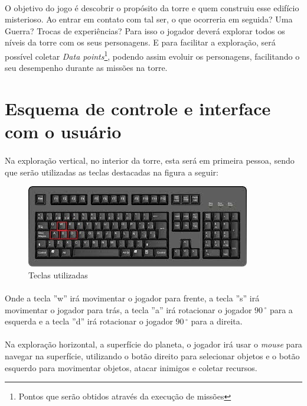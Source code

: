 \documentclass[11pt]{article} %
\begin{document}
\paragraph{}O objetivo do jogo é descobrir o propósito da torre e quem construiu esse edifício misterioso. Ao entrar em contato com tal ser, o que ocorreria em seguida? Uma Guerra? Trocas de experiências? Para isso o jogador deverá explorar todos os níveis da torre com os seus personagens. E para facilitar a exploração, será possível coletar \textit{Data points}\footnote{Pontos que serão obtidos através da execução de missões}, podendo assim evoluir os personagens, facilitando o seu desempenho durante as missões na torre. 

\section{Esquema de controle e interface com o usuário}

\paragraph{}Na exploração vertical, no interior da torre, esta será em primeira pessoa, sendo que serão utilizadas as teclas destacadas na figura a seguir:\\

\begin{figure}[!htp]
\centering
\includegraphics[scale=0.75]{pictures/teclado.jpg}
\caption{Teclas utilizadas}
\label{Teclado}
\end{figure}

\paragraph{}Onde a tecla ''w'' irá movimentar o jogador para frente, a tecla ''s'' irá movimentar o jogador para trás, a tecla ''a'' irá rotacionar o jogador $90\,^{\circ}$ para a esquerda e a tecla ''d'' irá rotacionar o jogador $90\,^{\circ}$ para a direita.

\paragraph{}Na exploração horizontal, a superfície do planeta, o jogador irá usar o \textit{mouse} para navegar na superfície, utilizando o botão direito para selecionar objetos e o botão esquerdo para movimentar objetos, atacar inimigos e coletar recursos.
\end{document}
